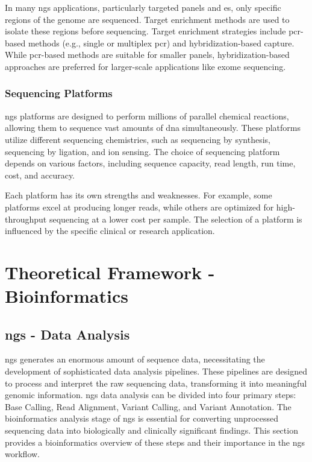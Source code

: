 In many \ac{ngs} applications, particularly targeted panels and \ac{es}, only specific regions of the genome are sequenced. Target enrichment methods are used to isolate these regions before sequencing. Target enrichment strategies include \ac{pcr}-based methods (e.g., single or multiplex \ac{pcr}) and hybridization-based capture. While \ac{pcr}-based methods are suitable for smaller panels, hybridization-based approaches are preferred for larger-scale applications like exome sequencing. \cite{Rehm2013}

\subsubsection{\textbf{Sequencing Platforms}} \label{subsubsec:ngs_platforms}

\ac{ngs} platforms are designed to perform millions of parallel chemical reactions, allowing them to sequence vast amounts of \ac{dna} simultaneously. These platforms utilize different sequencing chemistries, such as sequencing by synthesis, sequencing by ligation, and ion sensing. \cite{glenn2011} The choice of sequencing platform depends on various factors, including sequence capacity, read length, run time, cost, and accuracy. \cite{Rehm2013}

Each platform has its own strengths and weaknesses. For example, some platforms excel at producing longer reads, while others are optimized for high-throughput sequencing at a lower cost per sample. The selection of a platform is influenced by the specific clinical or research application. \cite{Rehm2013}


\section{Theoretical Framework - Bioinformatics} \label{sec:intro_bioinformatics}

\subsection{\acl{ngs} - Data Analysis} \label{subsec:ngs_data_analysis}

\ac{ngs} generates an enormous amount of sequence data, necessitating the development of sophisticated data analysis pipelines. These pipelines are designed to process and interpret the raw sequencing data, transforming it into meaningful genomic information. \ac{ngs} data analysis can be divided into four primary steps: Base Calling, Read Alignment, Variant Calling, and Variant Annotation. The bioinformatics analysis stage of \ac{ngs} is essential for converting unprocessed sequencing data into biologically and clinically significant findings. This section provides a bioinformatics overview of these steps and their importance in the \ac{ngs} workflow. \cite{Rehm2013}

